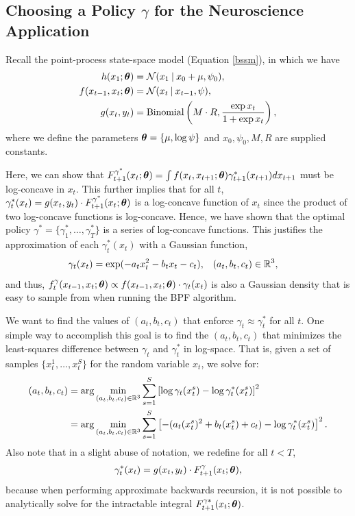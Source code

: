 \documentclass[twoside]{article}
\begin{document}
\subsection{Choosing a Policy $\gamma$ for the Neuroscience Application}  
Recall the point-process state-space model (Equation \ref{bssm}), in which we have
\begin{align*} 
h(x_1; \boldsymbol{\theta}) &= \mathcal{N}(x_1 \:\vert\: x_0 + \mu, \psi_0), \\
f(x_{t-1}, x_t ; \boldsymbol{\theta}) &= \mathcal{N}(x_t \:\vert\: x_{t-1} , \psi),  \\
g(x_t, y_t) &= \text{Binomial}\left(M \cdot R, \frac{\exp x_t}{1 + \exp x_t}\right),
\end{align*} 
where we define the parameters $\boldsymbol{\theta} = \{\mu, \log \psi\}$ and $x_0, \psi_0, M, R$ are supplied constants.   

Here, we can show that $F^{\gamma^*}_{t+1}(x_t; \boldsymbol{\theta}) = \int f(x_{t}, x_{t+1}; \boldsymbol{\theta})\gamma^*_{t+1}(x_{t+1}) dx_{t+1}$ must be log-concave in $x_{t}$.  This further implies that for all $t$, $\gamma^*_t(x_t) = g(x_t, y_t) \cdot F^{\gamma^*}_{t+1}(x_t; \boldsymbol{\theta})$ is a log-concave function of $x_t$ since the product of two log-concave functions is log-concave.  Hence, we have shown that the optimal policy $\gamma^* = \{\gamma^*_1, \ldots, \gamma^*_T\}$ is a series of log-concave functions.  This justifies the approximation of each $\gamma^*_t(x_t)$ with a Gaussian function, 
\begin{align*}
\gamma_t(x_t) = \exp(-a_t x_t^2 - b_t x_t - c_t), & \quad (a_t, b_t, c_t) \in \mathbb{R}^3,
\end{align*}
and thus, $f_t^{\gamma}(x_{t-1}, x_t; \boldsymbol{\theta}) \propto f(x_{t-1}, x_t; \boldsymbol{\theta}) \cdot \gamma_t(x_t)$ is also a Gaussian density that is easy to sample from when running the BPF algorithm.

We want to find the values of $(a_t, b_t, c_t)$ that enforce $\gamma_t \approx \gamma_t^*$ for all $t$.  One simple way to accomplish this goal is to find the $(a_t, b_t, c_t)$ that minimizes the least-squares difference between $\gamma_t$ and $\gamma_t^*$ in log-space.  That is, given a set of samples $\{x_t^1, \ldots, x_t^S\}$ for the random variable $x_t$, we solve for: 
\begin{align*}
(a_t, b_t, c_t) &= \arg \min_{(a_t, b_t, c_t) \in \mathbb{R}^3} \sum_{s=1}^S \left[\log \gamma_t(x_t^s) - \log \gamma^*_t(x_t^s) \right]^2  \\
&=  \arg \min_{(a_t, b_t, c_t) \in \mathbb{R}^3} \sum_{s=1}^S \left[-(a_t (x_t^s)^2 + b_t (x_t^s) + c_t) - \log \gamma^*_t(x_t^s) \right]^2.
\end{align*}
Also note that in a slight abuse of notation, we redefine for all $t < T$,
\begin{align*}
\gamma_t^*(x_t) = g(x_t, y_t) \cdot F^\gamma_{t+1}(x_t; \boldsymbol{\theta}), 
\end{align*}
because when performing approximate backwards recursion, it is not possible to analytically solve for the intractable integral $F^{\gamma*}_{t+1}(x_t; \boldsymbol{\theta})$.    
\end{document}
